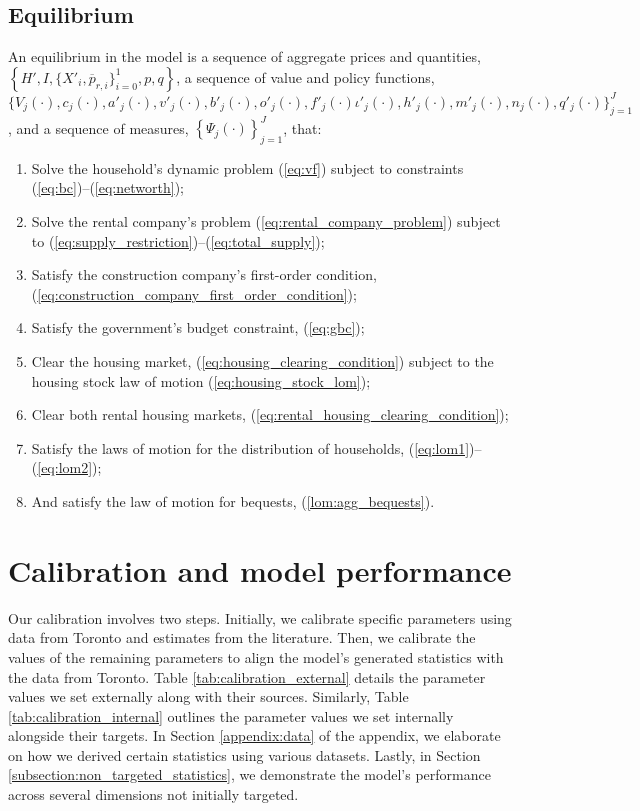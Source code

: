 \documentclass[parskip=full]{article}
\begin{document}
\subsection{Equilibrium}
An equilibrium in the model is a sequence of aggregate prices and quantities, $\left\{H',I,\{X'_{i},\overline{p}_{r,i}\}^{1}_{i=0},p,q\right\}$, a sequence of value and policy functions, $\biggl\{V_{j}(\cdot),c_{j}(\cdot),a'_{j}(\cdot),v'_{j}(\cdot),b'_{j}(\cdot),o'_{j}(\cdot),f'_{j}(\cdot)\iota'_{j}(\cdot),h'_{j}(\cdot),m'_{j}(\cdot),n_{j}(\cdot),q'_{j}(\cdot)\biggl\}_{j=1}^J$, and a sequence of measures, $\left\{\Psi_{j}(\cdot)\right\}_{j=1}^J$, that:
\begin{enumerate}
\item Solve the household's dynamic problem (\ref{eq:vf}) subject to constraints (\ref{eq:bc})--(\ref{eq:networth});
\item Solve the rental company's problem (\ref{eq:rental_company_problem}) subject to (\ref{eq:supply_restriction})--(\ref{eq:total_supply});
\item Satisfy the construction company's first-order condition, (\ref{eq:construction_company_first_order_condition});
\item Satisfy the government's budget constraint, (\ref{eq:gbc});
\item Clear the housing market,
(\ref{eq:housing_clearing_condition}) subject to the housing stock law of motion (\ref{eq:housing_stock_lom});
\item Clear both rental housing markets,
(\ref{eq:rental_housing_clearing_condition});
\item Satisfy the laws of motion for the distribution of households, (\ref{eq:lom1})--(\ref{eq:lom2});
\item And satisfy the law of motion for bequests, (\ref{lom:agg_bequests}).
\end{enumerate}

\section{Calibration and model performance}\label{sec:calibration}

Our calibration involves two steps. Initially, we calibrate specific parameters using data from Toronto and estimates from the literature. Then, we calibrate the values of the remaining parameters to align the model's generated statistics with the data from Toronto. Table \ref{tab:calibration_external} details the parameter values we set externally along with their sources. Similarly, Table \ref{tab:calibration_internal} outlines the parameter values we set internally alongside their targets. In Section \ref{appendix:data} of the appendix, we elaborate on how we derived certain statistics using various datasets. Lastly, in Section \ref{subsection:non_targeted_statistics}, we demonstrate the model's performance across several dimensions not initially targeted.
\end{document}
